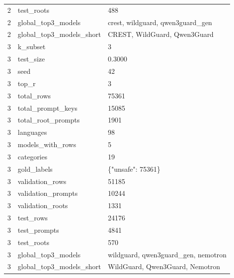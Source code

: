 \begin{tabular}{rll}
2 & test\_roots & 488 \\
2 & global\_top3\_models & crest, wildguard, qwen3guard\_gen \\
2 & global\_top3\_models\_short & CREST, WildGuard, Qwen3Guard \\
3 & k\_subset & 3 \\
3 & test\_size & 0.3000 \\
3 & seed & 42 \\
3 & top\_r & 3 \\
3 & total\_rows & 75361 \\
3 & total\_prompt\_keys & 15085 \\
3 & total\_root\_prompts & 1901 \\
3 & languages & 98 \\
3 & models\_with\_rows & 5 \\
3 & categories & 19 \\
3 & gold\_labels & \{"unsafe": 75361\} \\
3 & validation\_rows & 51185 \\
3 & validation\_prompts & 10244 \\
3 & validation\_roots & 1331 \\
3 & test\_rows & 24176 \\
3 & test\_prompts & 4841 \\
3 & test\_roots & 570 \\
3 & global\_top3\_models & wildguard, qwen3guard\_gen, nemotron \\
3 & global\_top3\_models\_short & WildGuard, Qwen3Guard, Nemotron \\
\bottomrule
\end{tabular}
